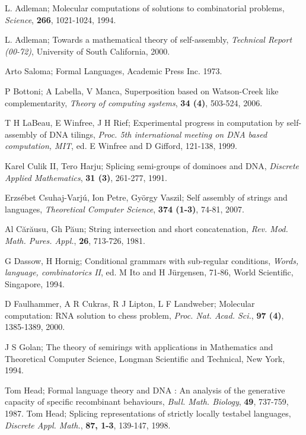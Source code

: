 \documentclass{llncs}
\begin{document}
\begin{thebibliography}{9}
 L. Adleman; Molecular computations of solutions to combinatorial problems, {\itshape Science}, {\bfseries 266}, 1021-1024, 1994.

 L. Adleman; Towards a mathematical theory of self-assembly, {\itshape Technical Report (00-72)}, University of South California, 2000.

 Arto Saloma; Formal Languages, Academic Press Inc. 1973.

 P Bottoni;  A Labella, V Manca, Superposition based on Watson-Creek like complementarity,  {\itshape Theory of computing systems}, {\bfseries 34 (4)}, 503-524, 2006.

  T H LaBeau, E Winfree, J H Rief; Experimental progress in computation by self-assembly of DNA tilings, {\itshape Proc. 5th international meeting on DNA based computation, MIT}, ed. E Winfree and D Gifford, 121-138, 1999.

 Karel Culik II, Tero Harju; Splicing semi-groups of
dominoes and DNA, {\itshape Discrete Applied Mathematics}, {\bfseries 31 (3)}, 261-277, 1991.

 Erzsébet Csuhaj-Varj\'{u}, Ion Petre, Gy\"orgy Vaszil; Self
assembly of strings and languages, {\itshape Theoretical Computer  Science}, {\bfseries 374 (1-3)},  74-81, 2007.

 Al C\u ar\u ausu, Gh P\u aun; String intersection and short concatenation, {\itshape Rev. Mod. Math. Pures. Appl.}, {\bfseries 26}, 713-726, 1981.


  G Dassow, H Hornig; Conditional grammars with sub-regular conditions, {\itshape Words, language, combinatorics II}, ed. M Ito and H J\"urgensen, 71-86, World Scientific, Singapore, 1994.

 D Faulhammer, A R Cukras, R J Lipton, L F Landweber; Molecular computation: RNA solution to chess problem, {\itshape Proc. Nat. Acad. Sci.}, {\bfseries 97 (4)},  1385-1389, 2000.

 J S Golan; The theory of semirings with applications in Mathematics and Theoretical Computer Science, Longman Scientific and Technical, New York, 1994.

Tom Head; Formal language theory and DNA : An analysis
of the generative capacity of specific recombinant behaviours,
{\itshape Bull. Math. Biology}, {\bfseries 49}, 737-759, 1987.
Tom Head; Splicing representations of strictly locally testabel languages,
{\itshape Discrete Appl. Math.}, {\bfseries 87, 1-3}, 139-147, 1998.


\end{thebibliography}
\end{document}
